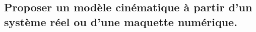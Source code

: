 \documentclass[10pt,fleqn]{book}
\newcommand{\repRel}{../..}
\newcommand{\repStyle}{\repRel/Style}
\newcommand{\td}{fichier_td}
\newcommand{\repExos}{\repRel/ExercicesCompetences}
\newcommand{\repExo}{dossier}
\begin{document}
\begin{multicols}{2} 

\end{multicols}

\subsection{Proposer un modèle cinématique à partir d'un système réel ou d'une maquette numérique.} 

\begin{multicols}{2} 

\renewcommand{\repExo}{\repExos/B2_ProposerModele/B2_12_ModeliserSchemasCinematiques/01_T}
\renewcommand{\td}{01_T}
\graphicspath{{\repStyle/png/}{\repExo/images/}}


\renewcommand{\repExo}{\repExos/B2_ProposerModele/B2_12_ModeliserSchemasCinematiques/02_R}
\renewcommand{\td}{02_R}
\graphicspath{{\repStyle/png/}{\repExo/images/}}


\renewcommand{\repExo}{\repExos/B2_ProposerModele/B2_12_ModeliserSchemasCinematiques/03_TT}
\renewcommand{\td}{03_TT}
\graphicspath{{\repStyle/png/}{\repExo/images/}}


\renewcommand{\repExo}{\repExos/B2_ProposerModele/B2_12_ModeliserSchemasCinematiques/04_RR}
\renewcommand{\td}{04_RR}
\graphicspath{{\repStyle/png/}{\repExo/images/}}


\renewcommand{\repExo}{\repExos/B2_ProposerModele/B2_12_ModeliserSchemasCinematiques/05_RT}
\renewcommand{\td}{05_RT}
\graphicspath{{\repStyle/png/}{\repExo/images/}}


\renewcommand{\repExo}{\repExos/B2_ProposerModele/B2_12_ModeliserSchemasCinematiques/06_TR}
\renewcommand{\td}{06_TR}
\graphicspath{{\repStyle/png/}{\repExo/images/}}


\renewcommand{\repExo}{\repExos/B2_ProposerModele/B2_12_ModeliserSchemasCinematiques/07_RR3D}
\renewcommand{\td}{07_RR3D}
\graphicspath{{\repStyle/png/}{\repExo/images/}}


\renewcommand{\repExo}{\repExos/B2_ProposerModele/B2_12_ModeliserSchemasCinematiques/08_RR3D}
\renewcommand{\td}{08_RR3D}
\graphicspath{{\repStyle/png/}{\repExo/images/}}


\renewcommand{\repExo}{\repExos/B2_ProposerModele/B2_12_ModeliserSchemasCinematiques/09_RT_RSG}
\renewcommand{\td}{09_RT_RSG}
\graphicspath{{\repStyle/png/}{\repExo/images/}}



\end{multicols}
\end{document}

